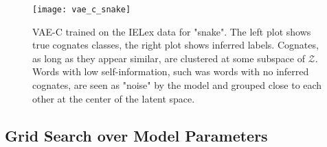\documentclass[6pt]{article}
\begin{document}
\begin{figure}[h!] %
   \centering
   \texttt{[image: vae\_c\_snake]} 
   \caption{VAE-C trained on the IELex data for "snake". The left plot shows true cognates classes, the right plot shows inferred labels. Cognates, as long as they appear similar, are clustered at some subspace of $\mathcal{Z}$. Words with low self-information, such was words with no inferred cognates, are seen as "noise" by the model and grouped close to each other at the center of the latent space.}
   \label{fig:vae_c_snake}
\end{figure}
\subsection{Grid Search over Model Parameters}
\end{document}
